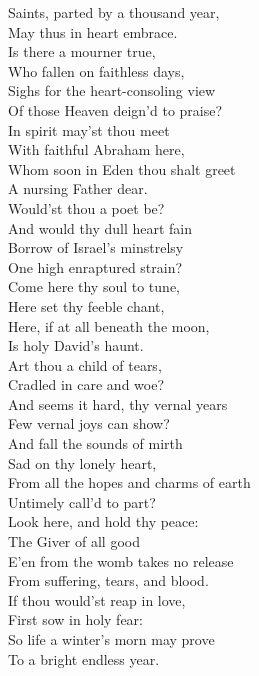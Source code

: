  Saints, parted by a thousand year, \\
 May thus in heart embrace. \\
  Is there a mourner true, \\
 Who fallen on faithless days, \\
 Sighs for the heart-consoling view \\
 Of those Heaven deign’d to praise? \\
  In spirit may’st thou meet \\
 With faithful Abraham here, \\
 Whom soon in Eden thou shalt greet \\
 A nursing Father dear. \\
  Would’st thou a poet be? \\
 And would thy dull heart fain \\
 Borrow of Israel’s minstrelsy \\
 One high enraptured strain? \\
  Come here thy soul to tune, \\
 Here set thy feeble chant, \\
 Here, if at all beneath the moon, \\
 Is holy David’s haunt. \\
  Art thou a child of tears, \\
 Cradled in care and woe? \\
 And seems it hard, thy vernal years \\
 Few vernal joys can show? \\
  And fall the sounds of mirth \\
 Sad on thy lonely heart, \\
 From all the hopes and charms of earth \\
 Untimely call’d to part? \\
  Look here, and hold thy peace: \\
 The Giver of all good \\
 E’en from the womb takes no release \\
 From suffering, tears, and blood. \\
  If thou would’st reap in love, \\
 First sow in holy fear: \\
 So life a winter’s morn may prove \\
 To a bright endless year.\\


